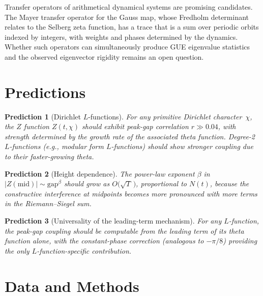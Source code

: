 \documentclass[11pt,a4paper]{article}
\newtheorem{prediction}{Prediction}
\begin{document}
Transfer operators of arithmetical dynamical systems are promising candidates.
The Mayer transfer operator for the Gauss map, whose Fredholm determinant relates to the Selberg zeta function, has a trace that is a sum over periodic orbits indexed by integers, with weights and phases determined by the dynamics.
Whether such operators can simultaneously produce GUE eigenvalue statistics and the observed eigenvector rigidity remains an open question.

\section{Predictions}

\begin{prediction}[Dirichlet $L$-functions]
For any primitive Dirichlet character~$\chi$, the $Z$ function $Z(t,\chi)$ should exhibit peak-gap correlation $r \gg 0.04$, with strength determined by the growth rate of the associated theta function.
Degree-2 $L$-functions (e.g., modular form $L$-functions) should show stronger coupling due to their faster-growing theta.
\end{prediction}

\begin{prediction}[Height dependence]
The power-law exponent $\beta$ in $|Z(\mathrm{mid})| \sim \mathrm{gap}^\beta$ should grow as $O\!\bigl(\!\sqrt{T}\,\bigr)$, proportional to $N(t)$, because the constructive interference at midpoints becomes more pronounced with more terms in the Riemann--Siegel sum.
\end{prediction}

\begin{prediction}[Universality of the leading-term mechanism]
For any $L$-function, the peak-gap coupling should be computable from the leading term of its theta function alone, with the constant-phase correction (analogous to $-\pi/8$) providing the only $L$-function-specific contribution.
\end{prediction}

\section{Data and Methods}
\end{document}
